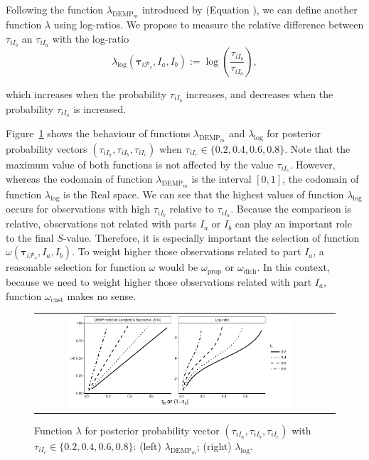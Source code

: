 \documentclass[submit]{smj}
\theoremstyle{definition}
\newcommand{\m}[1]{\boldsymbol{#1}}
\begin{document}
Following the function $\lambda_{\text{DEMP}_m}$ introduced by \cite{longford2014} (Equation \label{lambda_dempM}), we can define another function $\lambda$ using log-ratios. We propose to measure the relative difference between $\tau_{iI_b}$ an $\tau_{iI_a}$ with the log-ratio
\[
\lambda_{\log}(\m\tau_{i \mathcal{P}_s},  I_a,  I_b) := \log \left(\frac{ \tau_{iI_b} }{ \tau_{iI_a} }\right),
\]

which increases when the probability $\tau_{iI_b}$ increases, and decreases when the probability $\tau_{iI_a}$ is increased.

Figure~\ref{nonsymetric} shows the behaviour of functions $\lambda_{\text{DEMP}_m}$ and $\lambda_{\log}$ for posterior probability vectors $\left(\tau_{iI_a}, \tau_{iI_b}, \tau_{iI_c}\right)$ when $\tau_{iI_c} \in \{0.2, 0.4, 0.6, 0.8\}$. Note that the maximum value of both functions is not affected by the value $\tau_{iI_c}$. However, whereas the codomain of  function $\lambda_{\text{DEMP}_m}$ is the interval $[0,1]$, the codomain of function $\lambda_{\log}$ is the Real space. We can see that the highest values of function $\lambda_{\log}$ occurs for observations with high $\tau_{iI_b}$ relative to $\tau_{iI_a}$. Because the comparison is relative, observations not related with parts $I_a$ or $I_b$ can play an important role to the final $S$-value. Therefore, it is especially important the selection of function $\omega(\m\tau_{i \mathcal{P}_s},  I_a,  I_b)$. To weight higher those observations related to part $I_a$, a reasonable selection for function $\omega$ would be $\omega_{\text{prop}}$ or $\omega_{\text{dich}}$. In this context, because we need to weight higher those observations related with part $I_a$, function $\omega_{\text{cnst}}$ makes no sense.

\begin{figure}[htpb]
\begin{center}
\begin{tabular}{cc}
  \includegraphics[width=0.8\textwidth]{figures/demp2_log.pdf} \\
 \end{tabular}
 \caption{Function $\lambda$ for posterior probability vector $\left(\tau_{iI_a}, \tau_{iI_b}, \tau_{iI_c} \right)$ with $\tau_{iI_c} \in \{0.2, 0.4, 0.6, 0.8\}$: (left) $\lambda_{\text{DEMP}_m}$; (right) $\lambda_{\log}$.} 
\label{nonsymetric}
\end{center}
\end{figure}
\end{document}
